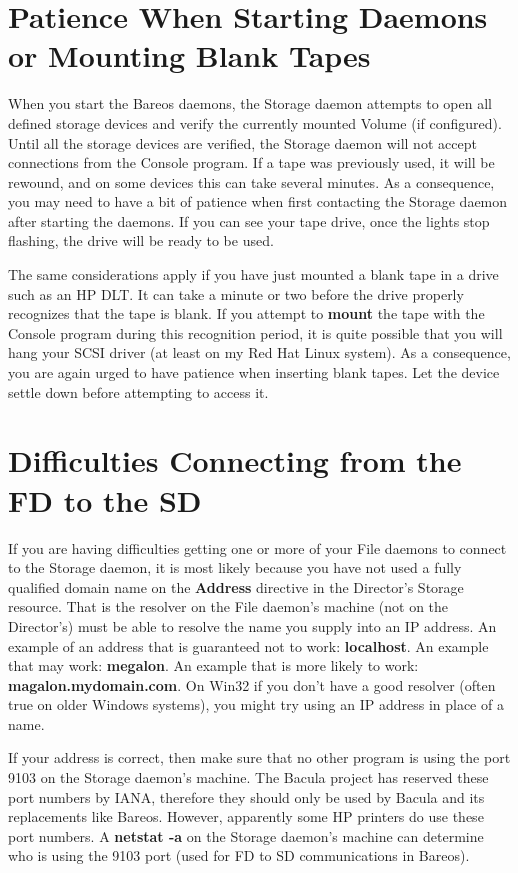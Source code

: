\section{Patience When Starting Daemons or Mounting Blank Tapes}

When you start the Bareos daemons, the Storage daemon attempts to open all
defined storage devices and verify the currently mounted Volume (if
configured). Until all the storage devices are verified, the Storage daemon
will not accept connections from the Console program. If a tape was previously
used, it will be rewound, and on some devices this can take several minutes.
As a consequence, you may need to have a bit of patience when first contacting
the Storage daemon after starting the daemons. If you can see your tape drive,
once the lights stop flashing, the drive will be ready to be used.

The same considerations apply if you have just mounted a blank tape in a drive
such as an HP DLT. It can take a minute or two before the drive properly
recognizes that the tape is blank. If you attempt to {\bf mount} the tape with
the Console program during this recognition period, it is quite possible that
you will hang your SCSI driver (at least on my Red Hat Linux system). As a
consequence, you are again urged to have patience when inserting blank tapes.
Let the device settle down before attempting to access it.

\section{Difficulties Connecting from the FD to the SD}

If you are having difficulties getting one or more of your File daemons to
connect to the Storage daemon, it is most likely because you have not used a
fully qualified domain name on the {\bf Address} directive in the
Director's Storage resource. That is the resolver on the File daemon's machine
(not on the Director's) must be able to resolve the name you supply into an IP
address. An example of an address that is guaranteed not to work: {\bf
localhost}. An example that may work: {\bf megalon}. An example that is more
likely to work: {\bf magalon.mydomain.com}. On Win32 if you don't have a good
resolver (often true on older Windows systems), you might try using an IP
address in place of a name.

If your address is correct, then make sure that no other program is using the
port 9103 on the Storage daemon's machine. The Bacula project has reserved 
these port numbers by IANA, therefore they should only be used by Bacula and its replacements like Bareos.
However, apparently
some HP printers do use these port numbers. A {\bf netstat -a} on the Storage
daemon's machine can determine who is using the 9103 port (used for FD to SD
communications in Bareos).



